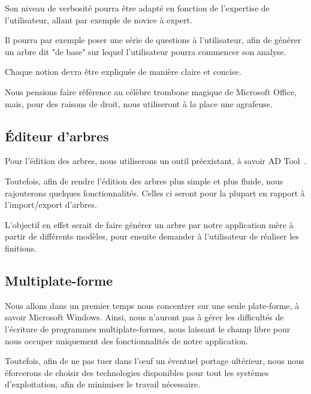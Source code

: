         Son niveau de verbosité pourra être adapté en fonction de l'expertise de l'utilisateur, allant par exemple de novice à expert. %
        
        Il pourra par exemple poser une série de questions à l'utilisateur, afin de générer un arbre dit "de base" sur lequel l'utilisateur pourra commencer son analyse.
        
        Chaque notion devra être expliquée de manière claire et concise.

        Nous pensions faire référence au célèbre trombone magique de Microsoft Office, mais, pour des raisons de droit, nous utiliseront à la place une agrafeuse.
        
    \subsection{\'Editeur d'arbres}
        \label{subsec:edit_arbre}
        Pour l'édition des arbres, nous utiliserons un outil préexistant, à savoir AD Tool~\cite{adtool_paper}.
        
        Toutefois, afin de rendre l'édition des arbres plus simple et plus fluide, nous rajouterons quelques fonctionnalités. Celles ci seront pour la plupart en rapport à l'import/export d'arbres.

        L'objectif en effet serait de faire générer un arbre par notre application mère à partir de différents modèles, pour ensuite demander à l'utilisateur de réaliser les finitions.
    
    \subsection{Multiplate-forme}
        Nous allons dans un premier temps nous concentrer sur une seule plate-forme, à savoir Microsoft Windows. Ainsi, nous n'auront pas à gérer les difficultés de l'écriture de programmes multiplate-formes, nous laissant le champ libre pour nous occuper uniquement des fonctionnalités de notre application.

        Toutefois, afin de ne pas tuer dans l’œuf un éventuel portage ultérieur, nous nous éforcerons de choisir des technologies disponibles pour tout les systèmes d'exploitation, afin de minimiser le travail nécessaire.